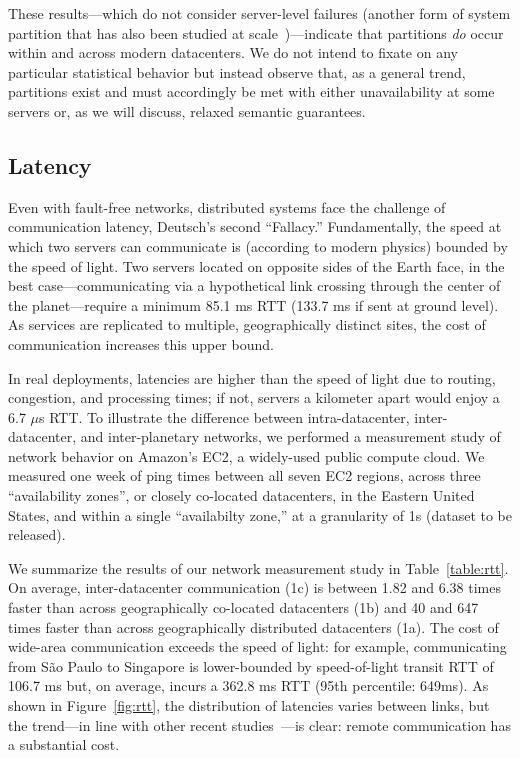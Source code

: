 These results---which do not consider server-level failures (another
form of system partition that has also been studied at
scale~\cite{google-availability})---indicate that partitions
\textit{do} occur within and across modern datacenters. We do not
intend to fixate on any particular statistical behavior but instead
observe that, as a general trend, partitions exist and must
accordingly be met with either unavailability at some servers or, as
we will discuss, relaxed semantic guarantees.

\subsection{Latency}

Even with fault-free networks, distributed systems face the challenge
of communication latency, Deutsch's second ``Fallacy.'' Fundamentally,
the speed at which two servers can communicate is (according to modern
physics) bounded by the speed of light. Two servers located on
opposite sides of the Earth face, in the best case---communicating via
a hypothetical link crossing through the center of the
planet---require a minimum 85.1 ms RTT (133.7 ms if sent at ground
level). As services are replicated to multiple, geographically
distinct sites, the cost of communication increases this upper bound.

In real deployments, latencies are higher than the speed of light due
to routing, congestion, and processing times; if not, servers a
kilometer apart would enjoy a 6.7 $\mu$s RTT. To illustrate the
difference between intra-datacenter, inter-datacenter, and
inter-planetary networks, we performed a measurement study of network
behavior on Amazon's EC2, a widely-used public compute cloud. We
measured one week of ping times between all seven EC2 regions, across
three ``availability zones'', or closely co-located datacenters, in
the Eastern United States, and within a single ``availabilty zone,''
at a granularity of 1s (dataset to be released).

We summarize the results of our network measurement study in
Table~\ref{table:rtt}. On average, inter-datacenter communication (1c)
is between 1.82 and 6.38 times faster than across geographically
co-located datacenters (1b) and 40 and 647 times faster than across
geographically distributed datacenters (1a). The cost of wide-area
communication exceeds the speed of light: for example, communicating
from S\~{a}o Paulo to Singapore is lower-bounded by speed-of-light
transit RTT of 106.7 ms but, on average, incurs a 362.8 ms RTT (95th
percentile: 649ms). As shown in Figure~\ref{fig:rtt}, the distribution
of latencies varies between links, but the trend---in line with other
recent studies~\cite{mdcc, redblue}---is clear: remote communication
has a substantial cost.

